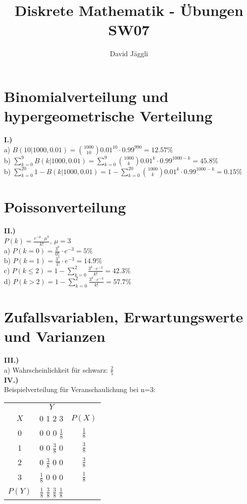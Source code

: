 \documentclass[12pt]{scrartcl}
\author{David Jäggli}
\title{Diskrete Mathematik - Übungen SW07}
\begin{document}
\maketitle

\tableofcontents

\newpage
\section{Binomialverteilung und hypergeometrische Verteilung}
\textbf{I.)}\\
a) $B(10|1000,0.01) = \binom{1000}{10}0.01^{10} \cdot 0.99^{990} = 12.57\%$\\
b) $\sum_{k=0}^{9}B(k|1000,0.01) = \sum_{k=0}^{9}\binom{1000}{k}0.01^k \cdot 0.99^{1000-k} = 45.8\%$\\
b) $\sum_{k=0}^{20} 1 - B(k|1000,0.01) = 1 - \sum_{k=0}^{20} \binom{1000}{k}0.01^k \cdot 0.99^{1000-k} = 0.15\%$\\


\section{Poissonverteilung}
\textbf{II.)}\\
$P(k) = \frac{e^{-\mu} \cdot \mu^k}{k!}$, $\mu = 3$\\

a) $P(k=0) = \frac{3^0}{0!} \cdot e^{-3} = 5\%$\\
b) $P(k=1) = \frac{3^1}{1!} \cdot e^{-3} = 14.9\%$\\
c) $P(k \leq 2) = 1 - \sum_{k=0}^{2} \frac{3^k \cdot e^{-3}}{k!} = 42.3\%$\\
d) $P(k > 2) = 1 - \sum_{k=0}^{2} \frac{3^k \cdot e^{-3}}{k!} = 57.7\%$

\section{Zufallsvariablen, Erwartungswerte und Varianzen}
\textbf{III.)}\\
a) Wahrscheinlichkeit für schwarz: $\frac{2}{5}$\\


\vspace{1.5cm}
\textbf{IV.)}\\
Beispielverteilung für Veranschaulichung bei n=3:
\renewcommand{\arraystretch}{1.5}
\begin{center}
    \begin{tabular}{  c | c | c  }
        & $Y$ & \\ 
        $X$ & 0 1 2 3 & $P(X)$\\ 
        \hline
        0 & 0 0 0 $\frac{1}{8}$ & $\frac{1}{8}$\\ 
        1 & 0 0 $\frac{3}{8}$ 0 & $\frac{3}{8}$\\ 
        2 & 0 $\frac{3}{8}$ 0 0 & $\frac{3}{8}$\\ 
        3 & $\frac{1}{8}$ 0 0 0 & $\frac{1}{8}$\\ 
        \hline
        $P(Y)$ & $\frac{1}{8}$ $\frac{3}{8}$ $\frac{3}{8}$ $\frac{1}{8}$ & \\ 
    \end{tabular}
\end{center}
\end{document}
